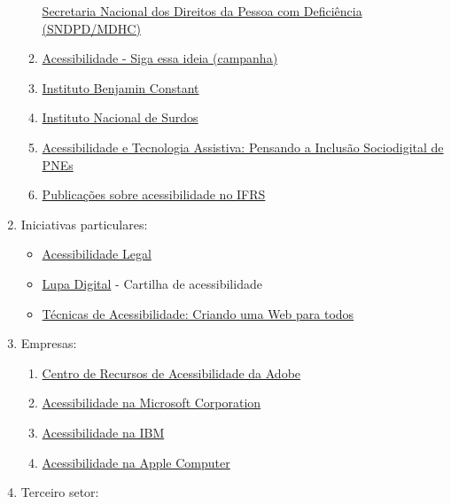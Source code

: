\documentclass[
  12pt,
  openright,
  twoside,
  a4paper,
  english,
  french,
  spanish,
  brazil
]{abntex2}
\begin{document}
\begin{enumerate}
\begin{enumerate}
      \href{
        https://www.gov.br/mdh/pt-br/navegue-por-temas/pessoa-com-deficiencia
      }{Secretaria Nacional dos Direitos da Pessoa com Deficiência (SNDPD/MDHC)}
    \item
      \href{
        https://www.youtube.com/watch?v=sfktCgSPE88
      }{Acessibilidade - Siga essa ideia (campanha)}
    \item \href{http://www.ibc.gov.br}{Instituto Benjamin Constant}
    \item \href{http://www.ines.gov.br}{Instituto Nacional de Surdos}
    \item
      \href{
        http://www.planetaeducacao.com.br/portal/conteudo_referencia/acessibilidade-tecnologia-assistiva.pdf
      }{
        Acessibilidade e Tecnologia Assistiva: Pensando a Inclusão Sociodigital
        de PNEs
      }
    \item
      \href{
        https://cta.ifrs.edu.br/category/publicacoes/nossos-livros
      }{Publicações sobre acessibilidade no IFRS}
  \end{enumerate}
  \item Iniciativas particulares:
  \begin{itemize}
    \item \href{http://www.acessibilidadelegal.com}{Acessibilidade Legal}
    \item
      \href{http://www.lupadigital.info}{Lupa Digital} - Cartilha de
      acessibilidade
    \item
      \href{
        http://jalvesnicacio.wordpress.com/2010/11/24/download-livro-tecnicas-de-acessibilidade-criando-uma-web-para-todos
      }{Técnicas de Acessibilidade: Criando uma Web para todos}
  \end{itemize}
  \item Empresas:
  \begin{enumerate}
    \item
      \href{
        http://www.adobe.com/br/accessibility
      }{Centro de Recursos de Acessibilidade da Adobe}
    \item
      \href{
        http://www.microsoft.com/enable
      }{Acessibilidade na Microsoft Corporation}
    \item \href{http://www-03.ibm.com/able}{Acessibilidade na IBM}
    \item
      \href{
        http://www.apple.com/accessibility
      }{Acessibilidade na Apple Computer}
  \end{enumerate}
  \item Terceiro setor:
  \begin{enumerate}

\end{enumerate}
\end{enumerate}
\end{document}
